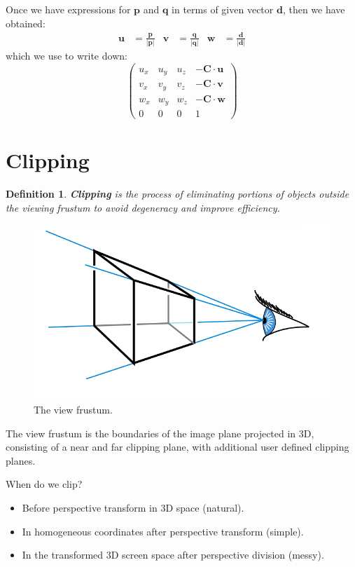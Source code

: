 \documentclass[11pt]{article}
\newtheorem{defn}{Definition}
\begin{document}
Once we have expressions for $\bm{p}$ and $\bm{q}$ in terms of given vector $\bm{d}$, then we have obtained:
\begin{align*}
  \bm{u} &= \frac{\bm{p}}{\lvert \bm{p} \rvert} &
  \bm{v} &= \frac{\bm{q}}{\lvert \bm{q} \rvert} &
  \bm{w} &= \frac{\bm{d}}{\lvert \bm{d} \rvert}
\end{align*}
which we use to write down:
\[
  \begin{pmatrix}
    u_x & u_y & u_z & -\bm{C} \cdot \bm{u} \\ 
    v_x & v_y & v_z & -\bm{C} \cdot \bm{v} \\ 
    w_x & w_y & w_z & -\bm{C} \cdot \bm{w} \\ 
    0 & 0 & 0 & 1
  \end{pmatrix}
\]

\section{Clipping}
\begin{defn}
  \textbf{Clipping} is the process of eliminating portions of objects outside the viewing frustum to avoid degeneracy and improve efficiency.
\end{defn}

\begin{figure}[htb!]
  \caption{The view frustum.}
  \includegraphics[scale=0.3]{frustum}
  \centering
\end{figure}

The view frustum is the boundaries of the image plane projected in 3D, consisting of a near and far clipping plane, with additional user defined clipping planes.

When do we clip?
\begin{itemize}
  \item Before perspective transform in 3D space (natural).
  \item In homogeneous coordinates after perspective transform (simple).
  \item In the transformed 3D screen space after perspective division (messy).
\end{itemize}
\end{document}
